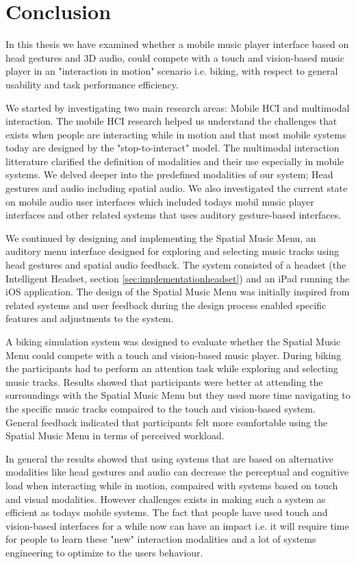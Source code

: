 \chapter{Conclusion}
In this thesis we have examined whether a mobile music player interface based on head gestures and 3D audio, could compete with a touch and vision-based music player in an "interaction in motion" scenario i.e. biking, with respect to general usability and task performance efficiency.

We started by investigating two main research areas: Mobile HCI and multimodal interaction. The mobile HCI research helped us understand the challenges that exists when people are interacting while in motion and that most mobile systems today are designed by the "stop-to-interact" model. The multimodal interaction litterature clarified the definition of modalities and their use especially in mobile systems. We delved deeper into the predefined modalities of our system; Head gestures and audio including spatial audio. We also investigated the current state on mobile audio user interfaces which included todays mobil music player interfaces and other related systems that uses auditory gesture-based interfaces.

We continued by designing and implementing the Spatial Music Menu, an auditory menu interface designed for exploring and selecting music tracks using head gestures and spatial audio feedback. The system consisted of a headset (the Intelligent Headset, section \ref{sec:implementationheadset}) and an iPad running the iOS application. The design of the Spatial Music Menu was initially inspired from related systems and user feedback during the design process enabled specific features and adjustments to the system. 

A biking simulation system was designed to evaluate whether the Spatial Music Menu could compete with a touch and vision-based music player. During biking the participants had to perform an attention task while exploring and selecting music tracks. Results showed that participants were better at attending the surroundings with the Spatial Music Menu but they used more time navigating to the specific music tracks compaired to the touch and vision-based system. General feedback indicated that participants felt more comfortable using the Spatial Music Menu in terms of perceived workload.

In general the results showed that using systems that are based on alternative modalities like head gestures and audio can decrease the perceptual and cognitive load when interacting while in motion, compaired with systems based on touch and visual modalities. However challenges exists in making such a system as efficient as todays mobile systems. The fact that people have used touch and vision-based interfaces for a while now can have an impact i.e. it will require time for people to learn these "new" interaction modalities and a lot of systems engineering to optimize to the users behaviour.

